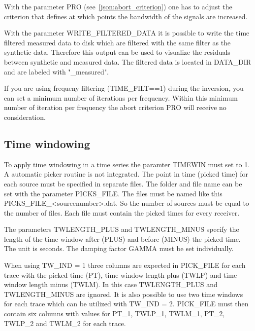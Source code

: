 With the parameter PRO (see~\ref{json:abort_criterion}) one has to adjust the criterion that defines at which points the bandwidth of the signals are increased.

With the parameter WRITE\_FILTERED\_DATA it is possible to write the time filtered measured data to disk which are filtered with the same filter as the synthetic data. Therefore this output can be used to visualize the residuals between synthetic and measured data. The filtered data is located in DATA\_DIR and are labeled with "\_measured".

If you are using frequeny filtering (TIME\_FILT==1) during the inversion, you can set a minimum number of iterations per frequency. Within this minimum number of iteration per frequency the abort criterion PRO will receive no consideration.

\subsection{Time windowing}
{\color{blue}{\begin{verbatim}
"Time windowing" : "comment",
			"TIMEWIN" : "0",
			"TW_IND" : "0",
			"PICKS_FILE" : "./picked_times/picks"
			"TWLENGTH_PLUS" : "0.01",
			"TWLENGTH_MINUS" : "0.01",
			"GAMMA" : "100000",
\end{verbatim}}}

{\color{red}{\begin{verbatim}
Default values are:
	TIMEWIN=0
\end{verbatim}}}

To apply time windowing in a time series the paramter TIMEWIN must set to 1. A automatic picker routine is not integrated. The point in time (picked time) for each source must be specified in separate files. The folder and file name can be set with the parameter PICKS\_FILE. The files must be named like this PICKS\_FILE\_<sourcenumber>.dat. So the number of sources must be equal to the number of files. Each file must contain the picked times for every receiver.

The parameters TWLENGTH\_PLUS and TWLENGTH\_MINUS specify the length of the time window after (PLUS) and before (MINUS) the picked time. The unit is seconds. The damping factor GAMMA must be set individually.

When using TW\_IND = 1 three columns are expected in PICK\_FILE for each trace with the picked time (PT), time window length plus (TWLP) and time window length minus (TWLM). In this case TWLENGTH\_PLUS and TWLENGTH\_MINUS are ignored. It is also possible to use two time windows for each trace which can be utilized with TW\_IND = 2. PICK\_FILE must then contain six columns with values for PT\_1, TWLP\_1, TWLM\_1, PT\_2, TWLP\_2 and TWLM\_2 for each trace.

